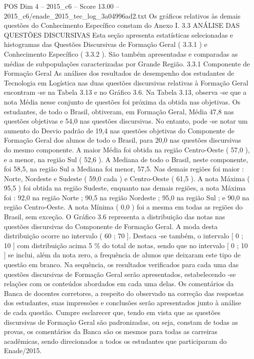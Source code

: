 \begin{textsample}{POS Dim 4 – 2015\_c6 – Score 13.00 – 2015\_c6/enade\_2015\_tec\_log\_3a04996ad2.txt}
Os gráficos relativos às demais questões do Conhecimento Específico constam do Anexo I. 3.3 ANÁLISE DAS QUESTÕES DISCURSIVAS Esta seção apresenta estatísticas selecionadas e histogramas das Questões Discursivas de Formação Geral ( 3.3.1 ) e Conhecimento Específico ( 3.3.2 ).
São também apresentadas e comparadas as médias de subpopulações caracterizadas por Grande Região. 3.3.1 Componente de Formação Geral As análises dos resultados de desempenho dos estudantes de Tecnologia em Logística nas duas questões discursivas relativas à Formação Geral encontram -se na Tabela 3.13 e no Gráfico 3.6.
Na Tabela 3.13, observa -se que a nota Média nesse conjunto de questões foi próxima da obtida nas objetivas.
Os estudantes, de todo o Brasil, obtiveram, em Formação Geral, Média 47,8 nas questões objetivas e 54,0 nas questões discursivas.
No entanto, pode -se notar um aumento do Desvio padrão de 19,4 nas questões objetivas do Componente de Formação Geral dos alunos de todo o Brasil, para 20,0 nas questões discursivas do mesmo componente.
A maior Média foi obtida na região Centro-Oeste ( 57,0 ), e a menor, na região Sul ( 52,6 ).
A Mediana de todo o Brasil, neste componente, foi 58,5, na região Sul a Mediana foi menor, 57,5.
Nas demais regiões foi maior : Norte, Nordeste e Sudeste ( 59,0 cada ) e Centro-Oeste ( 61,5 ).
A nota Máxima ( 95,5 ) foi obtida na região Sudeste, enquanto nas demais regiões, a nota Máxima foi : 92,0 na região Norte ; 90,5 na região Nordeste ; 95,0 na região Sul ; e 90,0 na região Centro-Oeste.
A nota Mínima ( 0,0 ) foi a mesma em todas as regiões do Brasil, sem exceção.
O Gráfico 3.6 representa a distribuição das notas nas questões discursivas do Componente de Formação Geral.
A moda desta distribuição ocorre no intervalo ( 60 ; 70 ].
Destaca -se também, o intervalo [ 0 ; 10 ] com distribuição acima 5 \% do total de notas, sendo que no intervalo [ 0 ; 10 ] se inclui, além da nota zero, a frequência de alunos que deixaram este tipo de questão em branco.
Na sequência, os resultados verificados para cada uma das questões discursivas de Formação Geral serão apresentados, estabelecendo -se relações com os conteúdos abordados em cada uma delas.
Os comentários da Banca de docentes corretores, a respeito do observado na correção das respostas dos estudantes, suas impressões e conclusões serão apresentados junto à análise de cada questão.
Cumpre esclarecer que, tendo em vista que as questões discursivas de Formação Geral são padronizadas, ou seja, constam de todas as provas, os comentários da Banca são os mesmos para todas as carreiras acadêmicas, sendo direcionados a todos os estudantes que participaram do Enade/2015.

\end{textsample}

